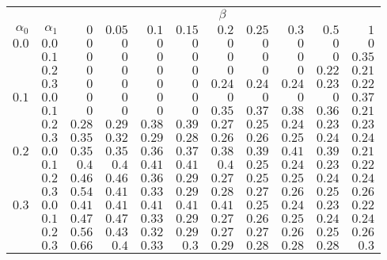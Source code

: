 \begin{tabular}{rr|rrrrrrrrr}
\hline\hline
 && \multicolumn{9}{c}{$\beta$}\\
 $\alpha_0$ & $\alpha_1$ & $0$ & $0.05$ & $0.1$ & $0.15$ & $0.2$ & $0.25$ & $0.3$ & $0.5$ & $1$ \\ 
 \hline
$0.0$ & $0.0$ & $0$ & $0$ & $0$ & $0$ & $0$ & $0$ & $0$ & $0$ & $0$\\ 
 & $0.1$ & $0$ & $0$ & $0$ & $0$ & $0$ & $0$ & $0$ & $0$ & $0.35$\\ 
 & $0.2$ & $0$ & $0$ & $0$ & $0$ & $0$ & $0$ & $0$ & $0.22$ & $0.21$\\ 
 & $0.3$ & $0$ & $0$ & $0$ & $0$ & $0.24$ & $0.24$ & $0.24$ & $0.23$ & $0.22$\\ 
\hline 
 $0.1$ & $0.0$ & $0$ & $0$ & $0$ & $0$ & $0$ & $0$ & $0$ & $0$ & $0.37$\\ 
 & $0.1$ & $0$ & $0$ & $0$ & $0$ & $0.35$ & $0.37$ & $0.38$ & $0.36$ & $0.21$\\ 
 & $0.2$ & $0.28$ & $0.29$ & $0.38$ & $0.39$ & $0.27$ & $0.25$ & $0.24$ & $0.23$ & $0.23$\\ 
 & $0.3$ & $0.35$ & $0.32$ & $0.29$ & $0.28$ & $0.26$ & $0.26$ & $0.25$ & $0.24$ & $0.24$\\ 
\hline 
 $0.2$ & $0.0$ & $0.35$ & $0.35$ & $0.36$ & $0.37$ & $0.38$ & $0.39$ & $0.41$ & $0.39$ & $0.21$\\ 
 & $0.1$ & $0.4$ & $0.4$ & $0.41$ & $0.41$ & $0.4$ & $0.25$ & $0.24$ & $0.23$ & $0.22$\\ 
 & $0.2$ & $0.46$ & $0.46$ & $0.36$ & $0.29$ & $0.27$ & $0.25$ & $0.25$ & $0.24$ & $0.24$\\ 
 & $0.3$ & $0.54$ & $0.41$ & $0.33$ & $0.29$ & $0.28$ & $0.27$ & $0.26$ & $0.25$ & $0.26$\\ 
\hline 
 $0.3$ & $0.0$ & $0.41$ & $0.41$ & $0.41$ & $0.41$ & $0.41$ & $0.25$ & $0.24$ & $0.23$ & $0.22$\\ 
 & $0.1$ & $0.47$ & $0.47$ & $0.33$ & $0.29$ & $0.27$ & $0.26$ & $0.25$ & $0.24$ & $0.24$\\ 
 & $0.2$ & $0.56$ & $0.43$ & $0.32$ & $0.29$ & $0.27$ & $0.27$ & $0.26$ & $0.25$ & $0.26$\\ 
 & $0.3$ & $0.66$ & $0.4$ & $0.33$ & $0.3$ & $0.29$ & $0.28$ & $0.28$ & $0.28$ & $0.3$\\ 
 \hline 
 \end{tabular}